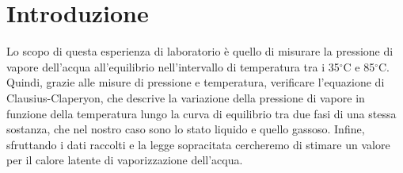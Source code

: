\section{Introduzione}

Lo scopo di questa esperienza di laboratorio è quello di misurare la pressione
di vapore dell'acqua all'equilibrio nell'intervallo di temperatura tra i 35$^\circ$C
e 85$^\circ$C. Quindi, grazie alle misure di pressione e temperatura, verificare
l'equazione di Clausius-Claperyon, che descrive la variazione della pressione di vapore
in funzione della temperatura lungo la curva di equilibrio tra due fasi di una stessa sostanza,
che nel nostro caso sono lo stato liquido e quello gassoso.
Infine, sfruttando i dati raccolti e la legge sopracitata cercheremo di stimare un valore
per il calore latente di vaporizzazione dell'acqua.